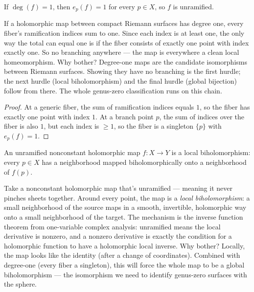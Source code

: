 \begin{lemma}
\label{lem:degree-one-no-ramification}
If \(\deg(f)=1\), then \(e_p(f)=1\) for every \(p\in X\), so \(f\) is
unramified.
\leanok
\end{lemma}

\begin{layman}
If a holomorphic map between compact Riemann surfaces has degree one,
every fiber's ramification indices sum to one. Since each index is at
least one, the only way the total can equal one is if the fiber consists
of exactly one point with index exactly one. So no branching anywhere —
the map is everywhere a clean local homeomorphism. Why bother?
Degree-one maps are the candidate isomorphisms between Riemann surfaces.
Showing they have no branching is the first hurdle; the next hurdle
(local biholomorphism) and the final hurdle (global bijection) follow
from there. The whole genus-zero classification runs on this chain.
\end{layman}

\begin{proof}\leanok
At a generic fiber, the sum of ramification indices equals \(1\), so the
fiber has exactly one point with index \(1\). At a branch point \(p\),
the sum of indices over the fiber is also \(1\), but each index is
\(\ge 1\), so the fiber is a singleton \(\{p\}\) with \(e_p(f)=1\).
\end{proof}

\begin{theorem}
\label{thm:local-biholo-unramified}
An unramified nonconstant holomorphic map \(f:X\to Y\) is a local
biholomorphism: every \(p\in X\) has a neighborhood mapped
biholomorphically onto a neighborhood of \(f(p)\).
\notready
\end{theorem}

\begin{layman}
Take a nonconstant holomorphic map that's unramified — meaning it never
pinches sheets together. Around every point, the map is a \emph{local
biholomorphism}: a small neighborhood of the source maps in a smooth,
invertible, holomorphic way onto a small neighborhood of the target.
The mechanism is the inverse function theorem from one-variable complex
analysis: unramified means the local derivative is nonzero, and a
nonzero derivative is exactly the condition for a holomorphic function
to have a holomorphic local inverse. Why bother? Locally, the map looks
like the identity (after a change of coordinates). Combined with
degree-one (every fiber a singleton), this will force the whole map to
be a global biholomorphism — the isomorphism we need to identify
genus-zero surfaces with the sphere.
\end{layman}

